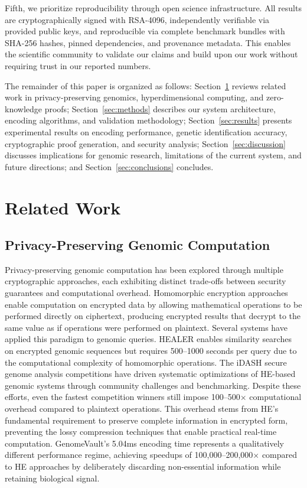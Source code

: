 \documentclass[11pt,letterpaper]{article}
\begin{document}
Fifth, we prioritize reproducibility through open science infrastructure. All results are cryptographically signed with RSA-4096, independently verifiable via provided public keys, and reproducible via complete benchmark bundles with SHA-256 hashes, pinned dependencies, and provenance metadata. This enables the scientific community to validate our claims and build upon our work without requiring trust in our reported numbers.

The remainder of this paper is organized as follows: Section~\ref{sec:related} reviews related work in privacy-preserving genomics, hyperdimensional computing, and zero-knowledge proofs; Section~\ref{sec:methods} describes our system architecture, encoding algorithms, and validation methodology; Section~\ref{sec:results} presents experimental results on encoding performance, genetic identification accuracy, cryptographic proof generation, and security analysis; Section~\ref{sec:discussion} discusses implications for genomic research, limitations of the current system, and future directions; and Section~\ref{sec:conclusions} concludes.

\section{Related Work}
\label{sec:related}

\subsection{Privacy-Preserving Genomic Computation}

Privacy-preserving genomic computation has been explored through multiple cryptographic approaches, each exhibiting distinct trade-offs between security guarantees and computational overhead. Homomorphic encryption approaches enable computation on encrypted data by allowing mathematical operations to be performed directly on ciphertext, producing encrypted results that decrypt to the same value as if operations were performed on plaintext. Several systems have applied this paradigm to genomic queries. HEALER \cite{chen2016} enables similarity searches on encrypted genomic sequences but requires 500--1000 seconds per query due to the computational complexity of homomorphic operations. The iDASH secure genome analysis competitions \cite{wang2017} have driven systematic optimizations of HE-based genomic systems through community challenges and benchmarking. Despite these efforts, even the fastest competition winners still impose 100--500$\times$ computational overhead compared to plaintext operations. This overhead stems from HE's fundamental requirement to preserve complete information in encrypted form, preventing the lossy compression techniques that enable practical real-time computation. GenomeVault's 5.04ms encoding time represents a qualitatively different performance regime, achieving speedups of 100,000--200,000$\times$ compared to HE approaches by deliberately discarding non-essential information while retaining biological signal.
\end{document}
